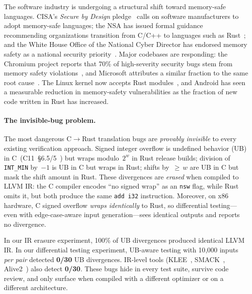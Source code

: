 \documentclass[10pt,a4paper]{article}
\begin{document}
The software industry is undergoing a structural shift toward
memory-safe languages.  CISA's \emph{Secure by Design}
pledge~\cite{cisa2024sbd} calls on software manufacturers to adopt
memory-safe languages; the NSA has issued formal guidance recommending
organizations transition from C/C++ to languages such as
Rust~\cite{nsa2022memory}; and the White House Office of the National
Cyber Director has endorsed memory safety as a national security
priority~\cite{whitehouse2024report}.  Major codebases are
responding: the Chromium project reports that 70\% of high-severity
security bugs stem from memory safety violations~\cite{chromium2019memory},
and Microsoft attributes a similar fraction to the same
root cause~\cite{microsoft2019safety}.  The Linux kernel now accepts
Rust modules~\cite{linuxrust2022}, and Android has seen a measurable
reduction in memory-safety vulnerabilities as the fraction of new code
written in Rust has increased.

\paragraph{The invisible-bug problem.}
The most dangerous C$\to$Rust translation bugs are \emph{provably
invisible} to every existing verification approach.  Signed integer
overflow is undefined behavior (UB) in C~(C11~\S6.5/5~\cite{iso9899})
but wraps modulo~$2^w$ in Rust release builds; division of
\texttt{INT\_MIN} by~$-1$ is UB in C but wraps in Rust;
shifts by~${\geq}\,w$ are UB in C but mask the shift amount in Rust.
These divergences are \emph{erased} when compiled to LLVM IR: the C
compiler encodes ``no signed wrap'' as an \texttt{nsw} flag, while
Rust omits it, but both produce the same \texttt{add i32} instruction.
Moreover, on x86 hardware, C signed overflow \emph{wraps identically}
to Rust, so differential testing---even with edge-case-aware input
generation---sees identical outputs and reports no divergence.

In our IR erasure experiment, 100\% of UB divergences produced
identical LLVM IR.  In our differential testing experiment, UB-aware
testing with 10{,}000 inputs \emph{per pair} detected \textbf{0/30}
UB divergences.  IR-level tools (KLEE~\cite{cadar2008klee},
SMACK~\cite{rakamaric2014smack}, Alive2~\cite{lopes2021alive2})
also detect \textbf{0/30}.  These bugs hide in every test suite,
survive code review, and only surface when compiled with a different
optimizer or on a different architecture.
\end{document}
